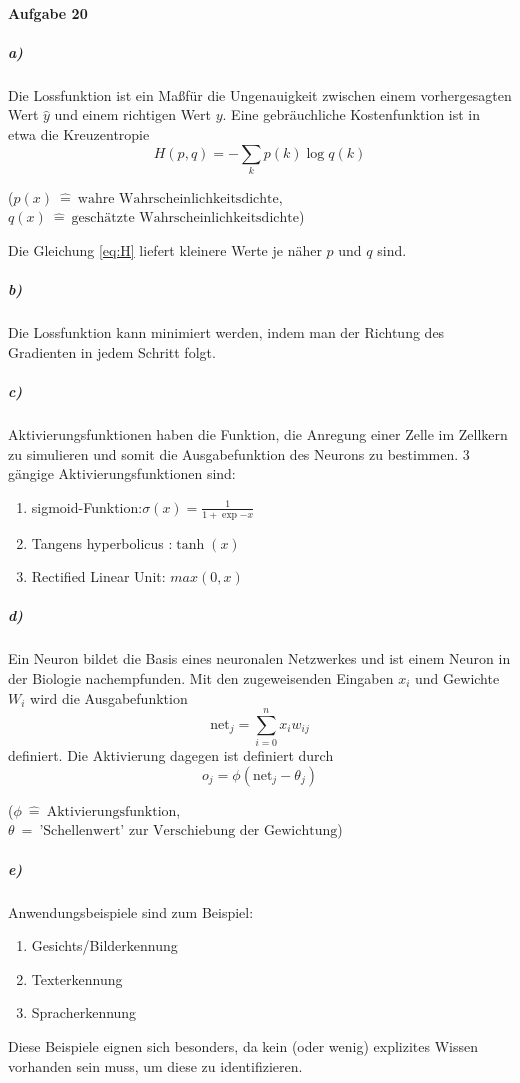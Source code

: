 \paragraph{Aufgabe 20}
\subparagraph{a)}
Die Lossfunktion ist ein Ma\ss für die Ungenauigkeit zwischen einem vorhergesagten Wert $\hat{y}$ und einem richtigen Wert $y$.
Eine gebräuchliche Kostenfunktion ist in etwa die Kreuzentropie
\begin{equation}
  H(p, q)=-\sum_k p(k) \log{q(k)} \label{eq:H}
\end{equation}
\begin{center}
 \tiny {($ p(x) \: \hat{=} \:\text{wahre Wahrscheinlichkeitsdichte}$, $ q(x) \: \hat{=} \:\text{geschätzte Wahrscheinlichkeitsdichte}$)}
\end{center}
Die Gleichung \eqref{eq:H} liefert kleinere Werte je näher $p$ und $q$ sind.

\subparagraph{b)}
Die Lossfunktion kann minimiert werden, indem man der Richtung des Gradienten in jedem Schritt folgt.

\subparagraph{c)}
Aktivierungsfunktionen haben die Funktion, die Anregung einer Zelle im Zellkern zu simulieren und somit die Ausgabefunktion des Neurons zu bestimmen.
3 gängige Aktivierungsfunktionen sind:
\begin{enumerate}
  \item sigmoid-Funktion:$\sigma(x)=\frac{1}{1+\exp{-x}}$
  \item Tangens hyperbolicus :$\tanh(x)$
  \item Rectified Linear Unit: $max(0, x)$
\end{enumerate}

\subparagraph{d)}
Ein Neuron bildet die Basis eines neuronalen Netzwerkes und ist einem Neuron in der Biologie nachempfunden. Mit den zugeweisenden Eingaben $x_i$ und Gewichte $W_i$ wird die
Ausgabefunktion
\begin{equation}
  \text{net}_j=\sum_{i=0}^{n} x_i w_{ij}
\end{equation}
definiert.
Die Aktivierung dagegen ist definiert durch
\begin{equation}
  o_j=\phi(\text{net}_j-\theta_j)
\end{equation}
\begin{center}
 \tiny {($ \phi \: \hat{=} \:\text{Aktivierungsfunktion}$, $ \theta \: \hat{=} \:\text{'Schellenwert' zur Verschiebung der Gewichtung}$)}
\end{center}

\subparagraph{e)}
Anwendungsbeispiele sind zum Beispiel:
\begin{enumerate}
  \item Gesichts/Bilderkennung
  \item Texterkennung
  \item Spracherkennung
\end{enumerate}
Diese Beispiele eignen sich besonders, da kein (oder wenig)  explizites Wissen vorhanden sein muss, um diese zu identifizieren.
